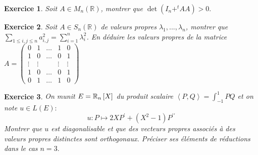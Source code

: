 \documentclass[12pt,a4paper]{article}
\newcommand{\R}{\mathbb{R}}
\theoremstyle{break}
\newtheorem{Exo}{Exercice}
\begin{document}
	
	  \begin{Exo}
	  	Soit $A\in M_{n}(\R)$, montrer que $\det \left(I_n+^{t}AA\right) >0.$
	  \end{Exo}
	
	\begin{Exo}
		Soit $A\in S_n(\R)$ de valeurs propres $\lambda_1,...,\lambda_n$, montrer que $\sum_{1\leqslant i,j\leqslant n}a_{i,j}^2=\sum_{i=1}^n \lambda_i^2$. En déduire les valeurs propres de la matrice $A=\begin{pmatrix}
			0 & 1 & \dots & 1 & 0 \\
			1 & 0 & \dots & 0 & 1 \\
			\vdots & \vdots &  & \vdots & \vdots \\
			1 & 0 & \dots & 0 & 1 \\
			0 & 1 & \dots & 1 & 0
		\end{pmatrix}$
		 
	\end{Exo}
	
%	
	
%	
	 \begin{Exo}
	 	 On munit $E=\Bbb{R}_{n}\left[ X\right] $ du produit scalaire $%
	\left\langle P,Q\right\rangle =\int_{-1}^{1}PQ$ et on note $u\in L\left(
	E\right) :$%
	\[
	u:P\longmapsto 2XP^{\prime }+\left( X^{2}-1\right) P^{\prime \prime } 
	\]
	Montrer que $u$ est diagonalisable et que des vecteurs propres associ\'{e}s
	\`{a} des valeurs propres distinctes sont orthogonaux. Pr\'{e}ciser ses
	\'{e}l\'{e}ments de r\'{e}ductions dans le cas $n=3.$
	 \end{Exo}
	
\end{document}
